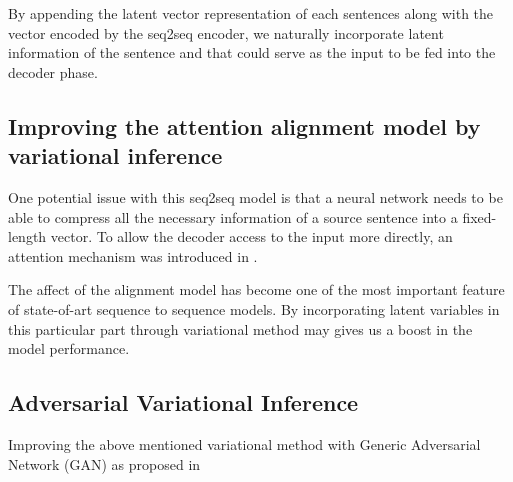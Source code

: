 \documentclass{article}
\begin{document}
By appending the latent vector representation of each sentences along with the vector encoded by the seq2seq encoder, we naturally incorporate latent information of the sentence and that could serve as the input to be fed into the decoder phase.

\subsection{Improving the attention alignment model by variational inference }

One potential issue with this seq2seq model is that a neural network needs to be able to compress all the necessary information of a source sentence into a fixed-length vector. To allow the decoder access to the input more directly, an attention mechanism was introduced in \cite{attention}.

The affect of the alignment model has become one of the most important feature of state-of-art sequence to sequence models. By incorporating latent variables in this particular part through variational method may gives us a boost in the model performance.

\subsection{Adversarial Variational Inference}
Improving the above mentioned variational method with Generic Adversarial Network (GAN) as proposed in \cite{avb}



\end{document}
